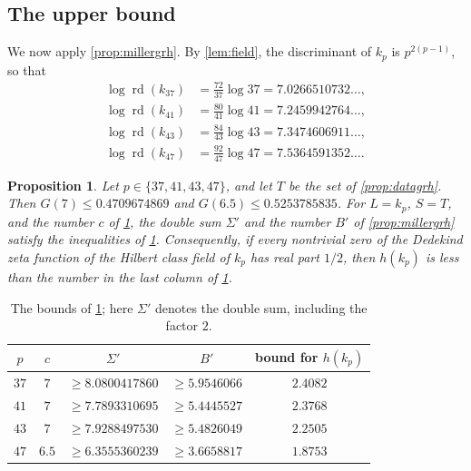 \documentclass[11pt]{amsart}
\theoremstyle{plain}
\newtheorem{proposition}[theorem]{Proposition}
\theoremstyle{definition}
\begin{document}
\subsection{The upper bound}

We now apply \cref{prop:millergrh}.
By \cref{lem:field}, the discriminant of $k_p$ is $p^{2(p-1)}$, so that
\begin{align*}
\log \operatorname{rd}(k_{37}) &= \tfrac{72}{37} \log 37 = 7.0266510732\ldots, \\
\log \operatorname{rd}(k_{41}) &= \tfrac{80}{41} \log 41 = 7.2459942764\ldots, \\
\log \operatorname{rd}(k_{43}) &= \tfrac{84}{43} \log 43 = 7.3474606911\ldots, \\
\log \operatorname{rd}(k_{47}) &= \tfrac{92}{47} \log 47 = 7.5364591352\ldots .
\end{align*}

\begin{proposition} \label{prop:boundgrh}
Let $p \in \{37, 41, 43, 47\}$, and let $T$ be the set of \cref{prop:datagrh}.
Then $G(7) \le 0.4709674869$ and $G(6.5) \le 0.5253785835$.
For $L = k_p$, $S = T$, and the number $c$ of \cref{tab:boundgrh}, the double sum $\Sigma'$ and the number $B'$ of \cref{prop:millergrh} satisfy the inequalities of \cref{tab:boundgrh}.
Consequently, if every nontrivial zero of the Dedekind zeta function of the Hilbert class field of $k_p$ has real part $1/2$, then $h(k_p)$ is less than the number in the last column of \cref{tab:boundgrh}.
\end{proposition}

\begin{table}[ht]
\centering
\begin{tabular}{ccccc}
\toprule
$p$ & $c$ & $\Sigma'$ & $B'$ & bound for $h(k_p)$ \\
\midrule
$37$ & $7$ & $\ge 8.0800417860$ & $\ge 5.9546066$ & $2.4082$ \\
$41$ & $7$ & $\ge 7.7893310695$ & $\ge 5.4445527$ & $2.3768$ \\
$43$ & $7$ & $\ge 7.9288497530$ & $\ge 5.4826049$ & $2.2505$ \\
$47$ & $6.5$ & $\ge 6.3555360239$ & $\ge 3.6658817$ & $1.8753$ \\
\bottomrule
\end{tabular}
\caption{The bounds of \cref{prop:boundgrh}; here $\Sigma'$ denotes the double sum, including the factor $2$.}
\label{tab:boundgrh}
\end{table}
\end{document}
